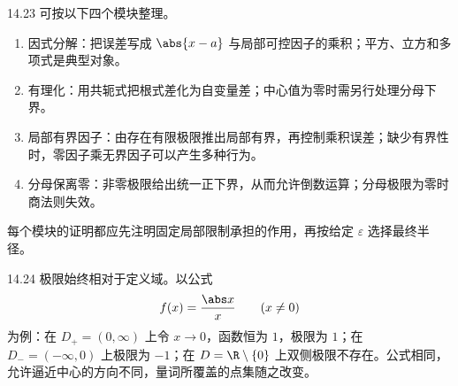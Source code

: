 \begin{solution}{14.23}
可按以下四个模块整理。
\begin{enumerate}
 \item 因式分解：把误差写成 \(\abs{x-a}\) 与局部可控因子的乘积；平方、立方和多项式是典型对象。
 \item 有理化：用共轭式把根式差化为自变量差；中心值为零时需另行处理分母下界。
 \item 局部有界因子：由存在有限极限推出局部有界，再控制乘积误差；缺少有界性时，零因子乘无界因子可以产生多种行为。
 \item 分母保离零：非零极限给出统一正下界，从而允许倒数运算；分母极限为零时商法则失效。
\end{enumerate}
每个模块的证明都应先注明固定局部限制承担的作用，再按给定 \(\varepsilon\) 选择最终半径。
\end{solution}

\begin{solution}{14.24}
极限始终相对于定义域。以公式
\[
 f(x)=\frac{\abs x}{x}\qquad(x\ne0)
\]
为例：在 \(D_+=(0,\infty)\) 上令 \(x\to0\)，函数恒为 \(1\)，极限为 \(1\)；在 \(D_-=(-\infty,0)\) 上极限为 \(-1\)；在 \(D=\R\setminus\{0\}\) 上双侧极限不存在。公式相同，允许逼近中心的方向不同，量词所覆盖的点集随之改变。
\end{solution}
